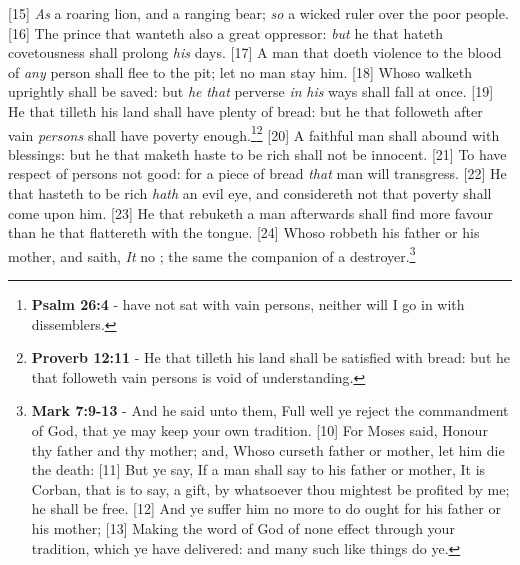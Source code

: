 [15] \textcolor[cmyk]{0.99998,1,0,0}{\emph{As} a roaring lion, and a ranging bear; \emph{so}  a wicked ruler over the poor people.}
[16] \textcolor[cmyk]{0.99998,1,0,0}{The prince that wanteth   also a great oppressor: \emph{but} he that hateth covetousness shall prolong \emph{his} days.}
[17] \textcolor[cmyk]{0.99998,1,0,0}{A man that doeth violence to the blood of \emph{any} person shall flee to the pit; let no man stay him.}
[18] \textcolor[cmyk]{0.99998,1,0,0}{Whoso walketh uprightly shall be saved: but \emph{he} \emph{that}  perverse \emph{in} \emph{his} ways shall fall at once.}
[19] \textcolor[cmyk]{0.99998,1,0,0}{He that tilleth his land shall have plenty of bread: but he that followeth after vain \emph{persons} shall have poverty enough.}\footnote{\textbf{Psalm 26:4} -  have not sat with vain persons, neither will I go in with dissemblers.}\footnote{\textbf{Proverb 12:11} - He that tilleth his land shall be satisfied with bread: but he that followeth vain persons is void of understanding.}
[20] \textcolor[cmyk]{0.99998,1,0,0}{A faithful man shall abound with blessings: but he that maketh haste to be rich shall not be innocent.}
[21] \textcolor[cmyk]{0.99998,1,0,0}{To have respect of persons  not good: for  a piece of bread \emph{that} man will transgress.}
[22] \textcolor[cmyk]{0.99998,1,0,0}{He that hasteth to be rich \emph{hath} an evil eye, and considereth not that poverty shall come upon him.}
[23] \textcolor[cmyk]{0.99998,1,0,0}{He that rebuketh a man afterwards shall find more favour than he that flattereth with the tongue.}
[24] \textcolor[cmyk]{0.99998,1,0,0}{Whoso robbeth his father or his mother, and saith, \emph{It}  no ; the same  the companion of a destroyer.}\footnote{\textbf{Mark 7:9-13} - And he said unto them, Full well ye reject the commandment of God, that ye may keep your own tradition. [10] For Moses said, Honour thy father and thy mother; and, Whoso curseth father or mother, let him die the death: [11] But ye say, If a man shall say to his father or mother, It is Corban, that is to say, a gift, by whatsoever thou mightest be profited by me; he shall be free. [12] And ye suffer him no more to do ought for his father or his mother; [13] Making the word of God of none effect through your tradition, which ye have delivered: and many such like things do ye.}
